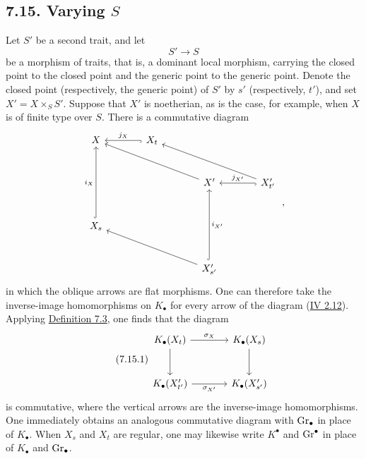 \subsection*{7.15. Varying $S$}
Let $S'$ be a second trait, and let
\[
S'\longrightarrow S
\]
be a morphism of traits, that is, a dominant local morphism, carrying the
closed point to the closed point and the generic point to the generic point.
Denote the closed point (respectively, the generic point) of $S'$ by $s'$
(respectively, $t'$), and set $X'=X\times_SS'$. Suppose that $X'$ is
noetherian, as is the case, for example, when $X$ is of finite type over $S$.
There is a commutative diagram
\[
\begin{tikzcd}[column sep=large,row sep=large]
X & X_t \arrow[l,hook,"j_X"'] & & \\
& & X' \arrow[ull] & X'_{t'} \arrow[l,hook,"j_{X'}"'] \arrow[ull] \\
X_s \arrow[uu,hook,"i_X"] & & & \\
& & X'_{s'} \arrow[uu,hook,"i_{X'}"'] \arrow[ull] &
\end{tikzcd}
\;,
\]
in which the oblique arrows are flat morphisms. One can therefore take the
inverse-image homomorphisms on $K_\bullet$ for every arrow of the diagram
(\hyperlink{sga6.e04.para.2-12}{IV 2.12}). Applying \hyperlink{sga6.e10.prop.7-3}{Definition 7.3}, one finds that the diagram
\begin{equation}\tag{7.15.1}
\begin{tikzcd}[column sep=large,row sep=large]
K_\bullet(X_t) \arrow[r,"\sigma_X"] \arrow[d] &
K_\bullet(X_s) \arrow[d]\\
K_\bullet(X'_{t'}) \arrow[r,"\sigma_{X'}"'] &
K_\bullet(X'_{s'})
\end{tikzcd}
\end{equation}
is commutative, where the vertical arrows are the inverse-image
homomorphisms. One immediately obtains an analogous commutative diagram with
$\operatorname{Gr}_\bullet$ in place of $K_\bullet$. When $X_s$ and $X_t$ are regular, one
may likewise write $K^\bullet$ and $\operatorname{Gr}^\bullet$ in place of $K_\bullet$ and
$\operatorname{Gr}_\bullet$.










\SGAArchiveOnly{}


